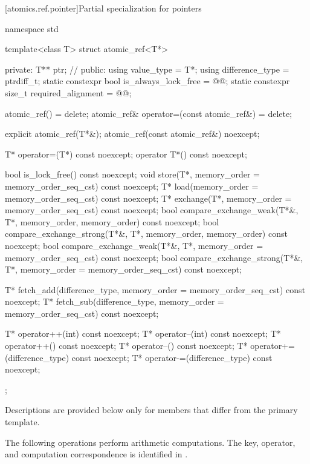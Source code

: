 [atomics.ref.pointer]{Partial specialization for pointers}
%

\begin{codeblock}
namespace std {
  template<class T> struct atomic_ref<T*> {
  private:
    T** ptr;              // \expos
  public:
    using value_type = T*;
    using difference_type = ptrdiff_t;
    static constexpr bool is_always_lock_free = @@;
    static constexpr size_t required_alignment = @@;

    atomic_ref() = delete;
    atomic_ref& operator=(const atomic_ref&) = delete;

    explicit atomic_ref(T*&);
    atomic_ref(const atomic_ref&) noexcept;

    T* operator=(T*) const noexcept;
    operator T*() const noexcept;

    bool is_lock_free() const noexcept;
    void store(T*, memory_order = memory_order_seq_cst) const noexcept;
    T* load(memory_order = memory_order_seq_cst) const noexcept;
    T* exchange(T*, memory_order = memory_order_seq_cst) const noexcept;
    bool compare_exchange_weak(T*&, T*,
                               memory_order, memory_order) const noexcept;
    bool compare_exchange_strong(T*&, T*,
                                 memory_order, memory_order) const noexcept;
    bool compare_exchange_weak(T*&, T*,
                               memory_order = memory_order_seq_cst) const noexcept;
    bool compare_exchange_strong(T*&, T*,
                                 memory_order = memory_order_seq_cst) const noexcept;

    T* fetch_add(difference_type, memory_order = memory_order_seq_cst) const noexcept;
    T* fetch_sub(difference_type, memory_order = memory_order_seq_cst) const noexcept;

    T* operator++(int) const noexcept;
    T* operator--(int) const noexcept;
    T* operator++() const noexcept;
    T* operator--() const noexcept;
    T* operator+=(difference_type) const noexcept;
    T* operator-=(difference_type) const noexcept;
  };
}
\end{codeblock}

\pnum
Descriptions are provided below only for members
that differ from the primary template.

\pnum
The following operations perform arithmetic computations.
The key, operator, and computation correspondence is identified
in .

